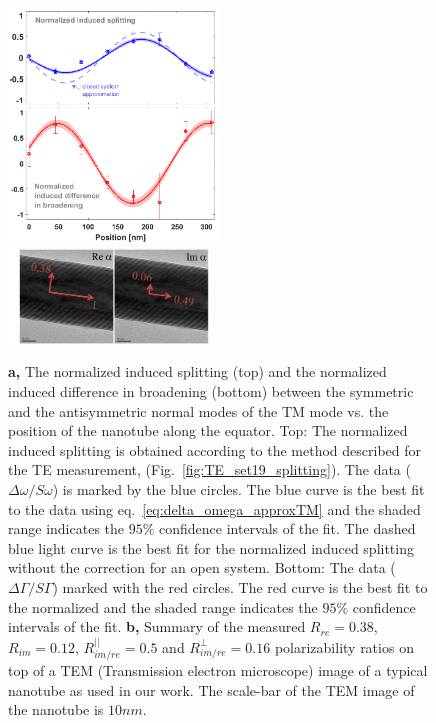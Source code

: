 \documentclass[journal=jacsat,manuscript=article]{achemso}
\begin{document}
\begin{figure}[H]
\centering
   \includegraphics[width=0.5\textwidth]{Images/NTset5TM-addphase038.png}\\
    \includegraphics[width=0.475\textwidth]{Images/TEM_NT_ratio_038A.png}
    \caption{ \textbf{a,} The normalized induced splitting (top) and the normalized induced difference in broadening (bottom) between the symmetric and the antisymmetric normal modes of the TM mode vs. the position of the nanotube along the equator. Top: The normalized induced splitting is obtained according to the method described for the TE measurement, (Fig.~\ref{fig:TE_set19_splitting}). The data ($\Delta \omega / \textit{S} \omega$) is marked by the blue circles. The blue curve is the best fit to the data using eq.~\ref{eq:delta_omega_approxTM} and the shaded range indicates the $95\%$ confidence intervals of the fit.
    The dashed blue light curve is the best fit for the normalized induced splitting without the correction for an open system. Bottom: The data ($\Delta \Gamma / \textit{S} \Gamma$) marked with the red circles. The red curve is the best fit to the normalized and the shaded range indicates the $95\%$ confidence intervals of the fit.
    \textbf{b,} Summary of the measured $R_{re}=0.38$, $R_{im}=0.12$, $R_{im/re}^{||}=0.5$ and $R_{im/re}^{\perp}=0.16$ polarizability ratios on top of a TEM (Transmission electron microscope) image of a typical  nanotube as  used in our work. The scale-bar of the TEM image of the nanotube is $10nm$.}
\label{fig:TM_width_splitting}
\end{figure}
\end{document}
